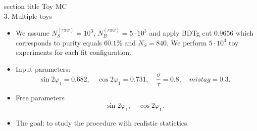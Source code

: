 \documentclass[10 pt,compress,mathserif]{beamer}
\begin{document}
\begin{frame}
 \centering
   \begin{beamercolorbox}[sep=8pt,center]{section title}
      Toy MC\\ 3. Multiple toys
   \end{beamercolorbox}
    \begin{block}{}
    \begin{itemize}
     \item We assume $N^{(raw)}_S=10^3$, $N^{(raw)}_{B}=5\cdot10^3$ and apply BDTg cut $0.9656$ which corresponds to purity equals $60.1\%$ and $N_S=840$. We perform $5\cdot 10^3$ toy experiments for each fit configuration.
     \item Input parameters:
     \begin{equation*}
      \sin2\varphi_1=0.682,\quad \cos2\varphi_1=0.731,\quad \frac{\sigma}{\tau}=0.8,\quad mistag = 0.3.
     \end{equation*}
     \item Free parameters
     \begin{equation*}
      \sin2\varphi_1,\quad \cos2\varphi_1.
     \end{equation*}
     \item The goal: to study the procedure with realistic statictics.
    \end{itemize}
    \end{block}
\end{frame}
\end{document}
